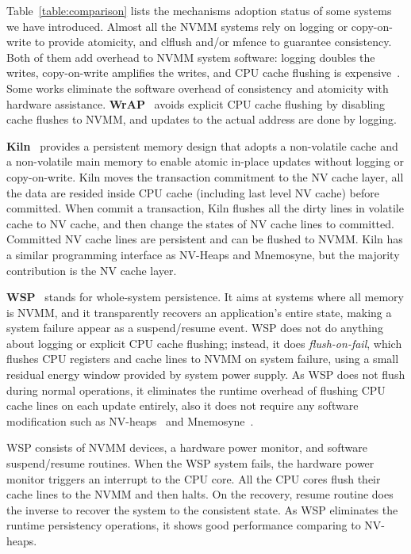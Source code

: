 Table~\ref{table:comparison} lists the mechanisms adoption status of some
systems we have introduced. Almost all the NVMM systems rely on logging or
copy-on-write to provide atomicity, and clflush and/or mfence to guarantee
consistency. Both of them add overhead to NVMM system software: logging doubles
the writes, copy-on-write amplifies the writes, and CPU cache flushing is
expensive~\cite{CPUcaching}. Some works eliminate the software overhead of
consistency and atomicity with hardware assistance.
\textbf{WrAP}~\cite{WrAP} avoids explicit CPU cache flushing by disabling
cache flushes to NVMM, and updates to the actual address are done by logging.

\textbf{Kiln}~\cite{Kiln} provides a persistent memory design
 that adopts a non-volatile
cache and a non-volatile main memory to enable atomic in-place updates without
logging or copy-on-write. Kiln moves the transaction commitment to the NV
cache layer, all the data are resided inside CPU cache (including last level
NV cache) before committed. When commit a transaction, Kiln flushes all
the dirty lines in volatile cache to NV cache, and then change the states of
NV cache lines to committed. Committed NV cache lines are persistent and
can be flushed to NVMM. Kiln has a similar programming interface as NV-Heaps
and Mnemosyne, but the majority contribution is the NV cache layer.

\textbf{WSP}~\cite{WSP} stands for whole-system persistence.
 It aims at systems where
all memory is NVMM, and it transparently recovers an application's entire state,
making a system failure appear as a suspend/resume event. WSP does not
do anything about logging or explicit CPU cache flushing; instead, it does 
\emph{flush-on-fail}, which flushes CPU registers and cache lines to NVMM
on system failure, using a small residual energy window provided by system
power supply. As WSP does not flush during normal operations, it eliminates
the runtime overhead of flushing CPU cache lines on each update entirely, also
it does not require any software modification such as NV-heaps~\cite{nvheaps}
 and Mnemosyne~\cite{mnemosyne}.

WSP consists of NVMM devices, a hardware power monitor, and software suspend/resume routines. When the WSP system fails, the hardware power monitor triggers
an interrupt to the CPU core. All the CPU cores flush their cache lines to the 
NVMM and then halts. On the recovery, resume routine does the inverse to recover
the system to the consistent state. As WSP eliminates the runtime persistency
operations, it shows good performance comparing to NV-heaps.

